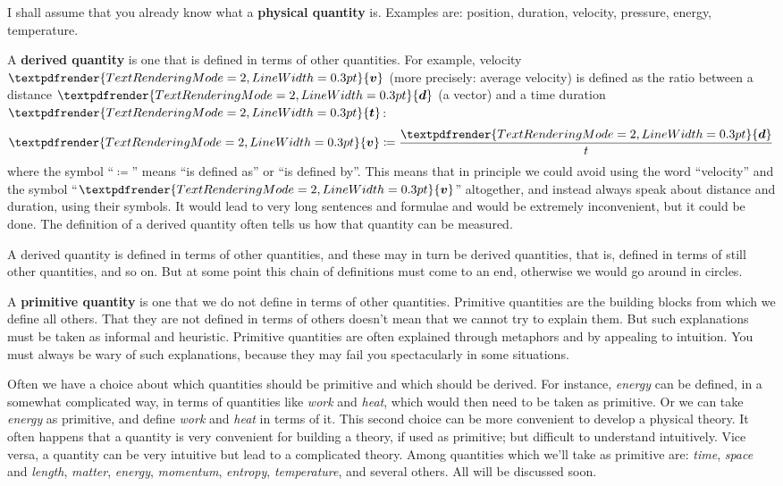 \documentclass[a4paper,12pt,%
onecolumn,oneside,titlepage,%
british%
]{memoir}
\renewcommand*{\bm}[1]{\textpdfrender{TextRenderingMode=2,LineWidth=0.3pt}{\boldsymbol{#1}}}
\newcommand*{\defd}{\coloneqq}
\renewcommand*{\|}[1][]{\nonscript\:#1\vert\nonscript\:\mathopen{}}
\begin{document}
I shall assume that you already know what a \textbf{physical quantity} is. Examples are: position, duration, velocity, pressure, energy, temperature.

A \textbf{derived quantity} is one that is defined in terms of other quantities. For example, velocity $\bm{v}$ (more precisely: average velocity) is defined as the ratio between a distance $\bm{d}$ (a vector) and a time duration $\bm{t}$:
\begin{equation*}
  \bm{v} \defd \frac{\bm{d}}{t}
\end{equation*}
where the symbol \enquote{$\defd$} means \enquote{is defined as} or \enquote{is defined by}. This means that in principle we could avoid using the word \enquote{velocity} and the symbol \enquote{$\bm{v}$} altogether, and instead always speak about distance and duration, using their symbols. It would lead to very long sentences and formulae and would be extremely inconvenient, but it could be done. The definition of a derived quantity often tells us how that quantity can be measured.

A derived quantity is defined in terms of other quantities, and these may in turn be derived quantities, that is, defined in terms of still other quantities, and so on. But at some point this chain of definitions must come to an end, otherwise we would go around in circles.

A \textbf{primitive quantity} is one that we do not define in terms of other quantities. Primitive quantities are the building blocks from which we define all others. That they are not defined in terms of others doesn't mean that we cannot try to explain them. But such explanations must be taken as informal and heuristic. Primitive quantities are often explained through metaphors and by appealing to intuition. You must always be wary of such explanations, because they may fail you spectacularly in some situations.

Often we have a choice about which quantities should be primitive and which should be derived. For instance, \emph{energy} can be defined, in a somewhat complicated way, in terms of quantities like \emph{work} and \emph{heat}, which would then need to be taken as primitive. Or we can take \emph{energy} as primitive, and define \emph{work} and \emph{heat} in terms of it. This second choice can be more convenient to develop a physical theory. It often happens that a quantity is very convenient for building a theory, if used as primitive; but difficult to understand intuitively. Vice versa,  a quantity can be very intuitive but lead to a complicated theory.
Among quantities which we'll take as primitive are:
\emph{time}, \emph{space} and \emph{length}, \emph{matter}, \emph{energy}, \emph{momentum},
\emph{entropy}, \emph{temperature}, and several others. All will be discussed soon.
\end{document}
